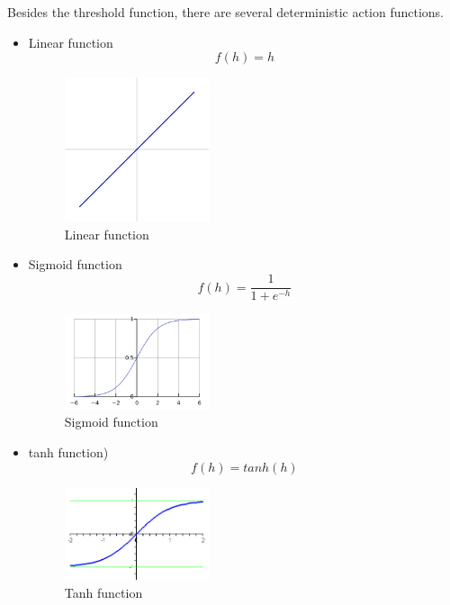 Besides the threshold function, there are several deterministic action functions.
\begin{itemize}
  \item Linear function 
\begin{equation}\label{eq:LinearFunc}
f(h) = h
\end{equation}

\graphicspath{ {./Figures/} }
\begin{figure}[!htb]
\centering
\includegraphics[width=0.4\textwidth]{Linear_function.png}
\caption{\label{fig:LinearFunc}Linear function}
\end{figure}
  
  \item Sigmoid function
\begin{equation}\label{eq:SigmoidFunc}
f(h) = \frac{1}{1+e^{-h}}
\end{equation}

\graphicspath{ {./Figures/} }
\begin{figure}[!htb]
\centering
\includegraphics[width=0.4\textwidth]{Logistic-curve.png}
\caption{\label{fig:SigmoidFunc}Sigmoid function}
\end{figure}

  \item tanh function)
\begin{equation}\label{eq:TanhFunc}
f(h) = tanh(h)
\end{equation}

\graphicspath{ {./Figures/} }
\begin{figure}[!htb]
\centering
\includegraphics[width=0.4\textwidth]{tanh.png}
\caption{\label{fig:TanhFunc}Tanh function}
\end{figure}
\end{itemize}

